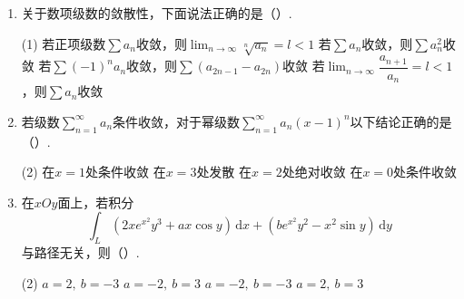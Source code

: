 \documentclass[../Main.tex]{subfiles}
\begin{document}
\begin{enumerate}
    \item 关于数项级数的敛散性，下面说法正确的是（\qquad）.

          \begin{tasks}[label=\textbf{\Alph*.}, label-width=1.5em, column-sep=1em](1)
              \task 若正项级数$\displaystyle\sum a_n$收敛，则$\displaystyle\lim_{n\to\infty}\sqrt[n]{a_n}=l<1$
              \task 若$\displaystyle\sum a_n$收敛，则$\displaystyle\sum a_n^2$收敛
              \task 若$\displaystyle\sum (-1)^n a_n$收敛，则$\displaystyle\sum(a_{2n-1}-a_{2n})$收敛
              \task 若$\displaystyle\lim_{n\to\infty}\dfrac{a_{n+1}}{a_n}=l<1$，则$\displaystyle\sum a_n$收敛
          \end{tasks}
          \vspace{1em}

    \item 若级数$\displaystyle\sum_{n=1}^{\infty}a_n$条件收敛，对于幂级数$\displaystyle\sum_{n=1}^{\infty}a_n(x-1)^n$以下结论正确的是（\qquad）.

          \begin{tasks}[label=\textbf{\Alph*.}, label-width=1.5em, column-sep=1em](2)
              \task 在$x=1$处条件收敛
              \task 在$x=3$处发散
              \task 在$x=2$处绝对收敛
              \task 在$x=0$处条件收敛
          \end{tasks}
          \vspace{1em}

    \item 在$xOy$面上，若积分
          \[
              \int_L(2xe^{x^2}y^3+ax\cos y)\,\mathrm{d}x+(be^{x^2}y^2-x^2\sin y)\,\mathrm{d}y
          \]
          与路径无关，则（\qquad）.

          \begin{tasks}[label=\textbf{\Alph*.}, label-width=1.5em, column-sep=1em](2)
              \task $a=2,\ b=-3$
              \task $a=-2,\ b=3$
              \task $a=-2,\ b=-3$
              \task $a=2,\ b=3$
          \end{tasks}
          \vspace{1em}
\end{enumerate}
\end{document}
